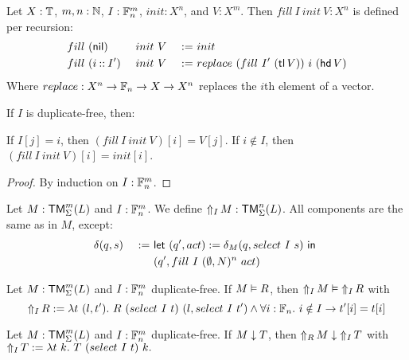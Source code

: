 \begin{definition}
  Let $X:\Type$, $m,n:\Nat$, $I:\Fin_n^m$, $init:X^n$, and $V:X^m$.  Then $fill~I~init~V : X^n$ is defined per recursion:
  \begin{alignat*}{3}
    & fill~(\nil      )&& ~init~V &~:=~& init \\
    & fill~(i \cons I')&& ~init~V &~:=~& replace~(fill~I'~(\tl V))~i~(\hd V)
  \end{alignat*}
  Where $replace : X^n \to \Fin_n \to X \to X^n$ replaces the $i$th element of a vector.
\end{definition}
\begin{lemma}
  If $I$ is duplicate-free, then:
  \begin{enumerate}
   \label{lem:fill_correct_nth}
    If $I[j]=i$, then $(fill~I~init~V)[i] = V[j]$.
   \label{lem:fill_not_index}
    If $i \notin I$, then $(fill~I~init~V)[i] = init[i]$.
  \end{enumerate}
\end{lemma}
\begin{proof}
  By induction on $I : \Fin_n^m$.
\end{proof}

\begin{definition}[$\LiftTapes{M}{I}$][LiftTapes]
  \label{def:LiftTapes}
  Let $M:\TM_\Sigma^m(L)$ and $I : \Fin_n^m$.  We define $\LiftTapes{M}{I} : \TM_\Sigma^n(L)$.  All components are the same as in $M$, except:
  \begin{alignat*}{2}
    &\delta(q,s) &~:=~& \Let{(q', act) := \delta_M(q, select~I~s)}{\\%
    &            &~  ~& (q', fill~I~(\None,N)^n~act)}
  \end{alignat*}
\end{definition}

\begin{lemma}
  \label{lem:LiftTapes_Realise}
  Let $M : \TM_\Sigma^m(L)$ and $I : \Fin_n^m$ duplicate-free.  If $M \Realise R$, then $\LiftTapes{M}{I} \Realise \LiftTapes{R}{I}$ with
  \[
    \LiftTapes{R}{I} := \lambda t~(l,t').~ R~(select~I~t)~(l, select~I~t') \land \forall i:\Fin_n.~i \notin I \rightarrow t'[i]=t[i]
  \]
\end{lemma}

\begin{lemma}
  \label{lem:LiftTapes_TerminatesIn}
  Let $M : \TM_\Sigma^m(L)$ and $I : \Fin_n^m$ duplicate-free. If $M \TerminatesIn T$, then $\LiftTapes{M}{R} \TerminatesIn \LiftTapes{T}{I}$ with
  $ \LiftTapes{T}{I} := \lambda t~k.~ T~(select~I~t)~k.  $
\end{lemma}

